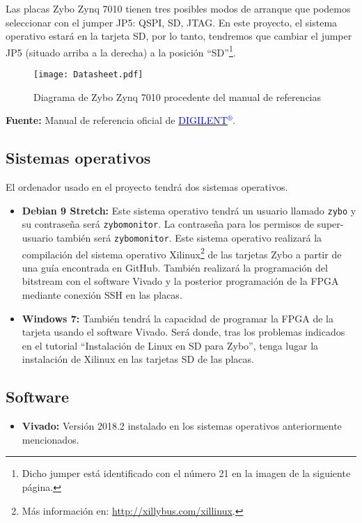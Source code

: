 \documentclass[12pt,letterpaper]{article}
\begin{document}
Las placas Zybo Zynq 7010 tienen tres posibles modos de arranque que podemos seleccionar con el jumper JP5: QSPI, SD, JTAG. En este proyecto, el sistema operativo estará en la tarjeta SD, por lo tanto, tendremos que cambiar el jumper JP5 (situado arriba a la derecha) a la posición ``SD''\footnote{Dicho jumper está identificado con el número 21 en la imagen de la siguiente página.}.
\newpage
\begin{figure}[h]
	\centering
	\texttt{[image: Datasheet.pdf]}
	\caption{Diagrama de Zybo Zynq 7010 procedente del manual de referencias}
	\label{Diagrama de Zybo Zynq 7010 procedente del manual de referencias}
\end{figure}
\begin{center}
	\textbf{Fuente:} Manual de referencia oficial de \href{https://reference.digilentinc.com/_media/zybo:zybo_rm.pdf}{\textcolor{blue}{DIGILENT$^{\circledR}$}}.
\end{center}

\newpage
\subsection{Sistemas operativos}
El ordenador usado en el proyecto tendrá dos sistemas operativos.
\begin{itemize}
	\item \textbf{Debian 9 Stretch:} Este sistema operativo tendrá un usuario llamado \texttt{zybo} y su contraseña será \texttt{zybomonitor}. La contraseña para los permisos de super-usuario también será \texttt{zybomonitor}. Este sistema operativo realizará la compilación del sistema operativo Xilinux\footnote{Más información en: \url{http://xillybus.com/xillinux}.} de las tarjetas Zybo a partir de una guía encontrada en GitHub. También realizará la programación del bitstream con el software Vivado y la posterior programación de la FPGA mediante conexión SSH en las placas.
	\item \textbf{Windows 7:} También tendrá la capacidad de programar la FPGA de la tarjeta usando el software Vivado. Será donde, tras los problemas indicados en el tutorial ``Instalación de Linux en SD para Zybo'', tenga lugar la instalación de Xilinux en las tarjetas SD de las placas.
\end{itemize}

\subsection{Software}
\begin{itemize}
	\item \textbf{Vivado:} Versión 2018.2 instalado en los sistemas operativos anteriormente mencionados.
\end{itemize}
\end{document}
